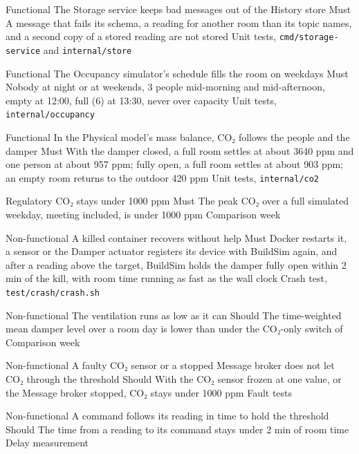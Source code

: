   {Functional}
  {The Storage service keeps bad messages out of the History store}
  {Must}
  {A message that fails its schema, a reading for another room than its topic
   names, and a second copy of a stored reading are not stored}
  {Unit tests, \texttt{cmd/\allowbreak storage-service} and
   \texttt{internal/store}}

  {Functional}
  {The Occupancy simulator's schedule fills the room on weekdays}
  {Must}
  {Nobody at night or at weekends, 3 people mid-morning and mid-afternoon,
   empty at 12:00, full (6) at 13:30, never over capacity}
  {Unit tests, \texttt{internal/\allowbreak occupancy}}

  {Functional}
  {In the Physical model's mass balance, CO₂ follows the people and the
   damper}
  {Must}
  {With the damper closed, a full room settles at about 3640 ppm and one
   person at about 957 ppm; fully open, a full room settles at about 903 ppm;
   an empty room returns to the outdoor 420 ppm}
  {Unit tests, \texttt{internal/co2}}

  {Regulatory}
  {CO₂ stays under 1000 ppm}
  {Must}
  {The peak CO₂ over a full simulated weekday, meeting included, is under 1000
   ppm}
  {Comparison week}

  {Non-functional}
  {A killed container recovers without help}
  {Must}
  {Docker restarts it, a sensor or the Damper actuator registers its device
   with BuildSim again, and after a reading above the target, BuildSim holds
   the damper fully open within 2 min of the kill, with room time running as
   fast as the wall clock}
  {Crash test, \texttt{test/crash/crash.sh}}

  {Non-functional}
  {The ventilation runs as low as it can}
  {Should}
  {The time-weighted mean damper level over a room day is lower than under the
   CO₂-only switch of }
  {Comparison week}

  {Non-functional}
  {A faulty CO₂ sensor or a stopped Message broker does not let CO₂ through the
   threshold}
  {Should}
  {With the CO₂ sensor frozen at one value, or the Message broker stopped, CO₂
   stays under 1000 ppm}
  {Fault tests}

  {Non-functional}
  {A command follows its reading in time to hold the threshold}
  {Should}
  {The time from a reading to its command stays under 2 min of room time}
  {Delay measurement}
